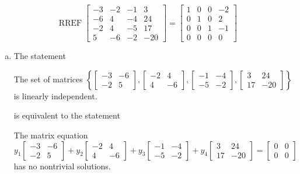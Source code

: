\begin{exerciseAnswer} 


\[\operatorname{RREF} \left[\begin{array}{cccc}
-3 & -2 & -1 & 3 \\
-6 & 4 & -4 & 24 \\
-2 & 4 & -5 & 17 \\
5 & -6 & -2 & -20
\end{array}\right] = \left[\begin{array}{cccc}
1 & 0 & 0 & -2 \\
0 & 1 & 0 & 2 \\
0 & 0 & 1 & -1 \\
0 & 0 & 0 & 0
\end{array}\right] \]


\begin{enumerate}[(a)]
\item The statement 
\begin{center}\begin{minipage}{0.8\textwidth}
 The set of matrices \( \left\{ \left[\begin{array}{cc}
-3 & -6 \\
-2 & 5
\end{array}\right] , \left[\begin{array}{cc}
-2 & 4 \\
4 & -6
\end{array}\right] , \left[\begin{array}{cc}
-1 & -4 \\
-5 & -2
\end{array}\right] , \left[\begin{array}{cc}
3 & 24 \\
17 & -20
\end{array}\right] \right\} \) is linearly independent.
\end{minipage}\end{center}
     is equivalent to the statement 
\begin{center}\begin{minipage}{0.8\textwidth}
 The matrix equation \[ y_{1} \left[\begin{array}{cc}
-3 & -6 \\
-2 & 5
\end{array}\right] + y_{2} \left[\begin{array}{cc}
-2 & 4 \\
4 & -6
\end{array}\right] + y_{3} \left[\begin{array}{cc}
-1 & -4 \\
-5 & -2
\end{array}\right] + y_{4} \left[\begin{array}{cc}
3 & 24 \\
17 & -20
\end{array}\right] = \left[\begin{array}{cc}
0 & 0 \\
0 & 0
\end{array}\right] \] has no nontrivial solutions. 
\end{minipage}\end{center}
    

\end{enumerate}
\end{exerciseAnswer}
